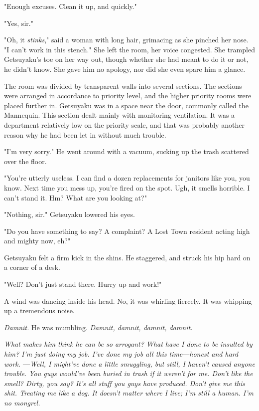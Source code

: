 "Enough excuses. Clean it up, and quickly."

"Yes, sir."

"Oh, it \emph{stinks}," said a woman with long hair, grimacing as she pinched
her nose. "I can't work in this stench." She left the room, her voice
congested. She trampled Getsuyaku's toe on her way out, though whether
she had meant to do it or not, he didn't know. She gave him no apology,
nor did she even spare him a glance.

The room was divided by transparent walls into several sections. The
sections were arranged in accordance to priority level, and the higher
priority rooms were placed further in. Getsuyaku was in a space near the
door, commonly called the Mannequin. This section dealt mainly with
monitoring ventilation. It was a department relatively low on the
priority scale, and that was probably another reason why he had been let
in without much trouble.

"I'm very sorry." He went around with a vacuum, sucking up the trash
scattered over the floor.

"You're utterly useless. I can find a dozen replacements for janitors
like you, you know. Next time you mess up, you're fired on the spot.
Ugh, it smells horrible. I can't stand it. Hm? What are you looking at?"

"Nothing, sir." Getsuyaku lowered his eyes.

"Do you have something to say? A complaint? A Lost Town resident acting
high and mighty now, eh?"

Getsuyaku felt a firm kick in the shins. He staggered, and struck his
hip hard on a corner of a desk.

"Well? Don't just stand there. Hurry up and work!"

A wind was dancing inside his head. No, it was whirling fiercely. It was
whipping up a tremendous noise.

\emph{Damnit.} He was mumbling. \emph{Damnit, damnit, damnit, damnit.}

\emph{What makes him think he can be so arrogant? What have I done to be
insulted by him? I'm just doing my job. I've done my job all this
time―honest and hard work. ―Well, I might've done a little smuggling,
but still, I haven't caused anyone trouble. You guys would've been
buried in trash if it weren't for me. Don't like the smell? Dirty, you
say? It's all stuff you guys have produced. Don't give me this shit.
Treating me like a dog. It doesn't matter where I live; I'm still a
human. I'm no mongrel.}


